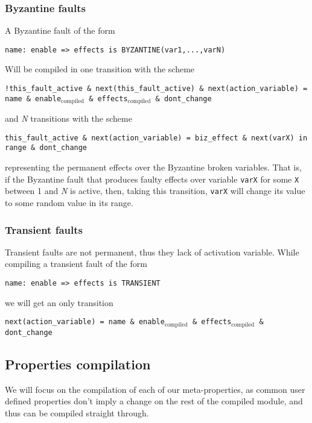 \documentclass[12pt]{llncs2e/llncs}
\newcommand{\textusc}[1]{$_{\text{#1}}$} %
\begin{document}
\subsubsection*{Byzantine faults}
A Byzantine fault of the form
\begin{center}
\texttt{name: enable => effects is BYZANTINE(var1,...,varN)}
\end{center}
Will be compiled in one transition with the scheme
\begin{center}
\texttt{!this\_fault\_active \& next(this\_fault\_active) \& next(action\_variable) = name \& enable\textusc{compiled} \& effects\textusc{compiled} \& dont\_change}
\end{center}
and \textit{N} transitions with the scheme
\begin{center}
\texttt{this\_fault\_active \& next(action\_variable) = biz\_effect \& next(varX) in range \& dont\_change}
\end{center}
representing the permanent effects over the Byzantine broken variables. That is, if the Byzantine fault that produces faulty effects over variable \texttt{varX} for some \texttt{X} between 1 and \textit{N} is active, then, taking this transition, \texttt{varX} will change its value to some random value in its range.

\subsubsection*{Transient faults}
Transient faults are not permanent, thus they lack of activation variable. While compiling a transient fault of the form
\begin{center}
\texttt{name: enable => effects is TRANSIENT}
\end{center}
we will get an only transition
\begin{center}
\texttt{next(action\_variable) = name \& enable\textusc{compiled} \& effects\textusc{compiled} \& dont\_change}
\end{center}


\subsection{Properties compilation}
We will focus on the compilation of each of our meta-properties, as common user defined properties don't imply a change on the rest of the compiled module, and thus can be compiled straight through.
\end{document}
